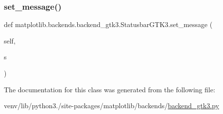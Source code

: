 \subsubsection{\texorpdfstring{set\+\_\+message()}{set\_message()}}
{\footnotesize\ttfamily def matplotlib.\+backends.\+backend\+\_\+gtk3.\+Statusbar\+G\+T\+K3.\+set\+\_\+message (\begin{DoxyParamCaption}\item[{}]{self,  }\item[{}]{s }\end{DoxyParamCaption})}



The documentation for this class was generated from the following file\+:\begin{DoxyCompactItemize}
\item 
venv/lib/python3./site-\/packages/matplotlib/backends/\hyperlink{backend__gtk3_8py}{backend\+\_\+gtk3.\+py}\end{DoxyCompactItemize}
